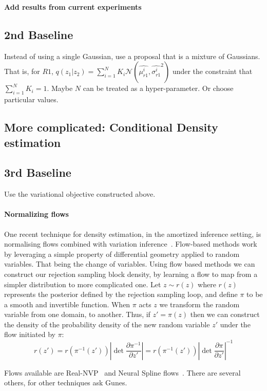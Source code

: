 \documentclass{article}
\begin{document}
\textbf{Add results from current experiments}

\subsection{2nd Baseline}
Instead of using a single Gaussian, use a proposal that is a mixture of Gaussians. 
That is, for $R1$,   $q(z_{1} | z_{2}) = \sum^{N}_{i=1}K_{i}\mathcal{N}(\hat{\mu^{i}_{r1}},  \hat{\sigma^{i}_{r1}}^{2})$
under the constraint that $\sum^{N}_{i=1}K_{i} = 1$. Maybe $N$ can be treated as a hyper-parameter. 
Or choose particular values.
\subsection{More complicated: Conditional Density estimation}

\subsection{3rd Baseline}
 
Use the variational objective constructed above. 

\paragraph{Normalizing flows} One recent technique for density estimation, in the amortized inference setting,
is normalising flows combined with variation inference~\cite{rezende2015variational}.
Flow-based methods work by leveraging a simple property of differential geometry applied 
to random variables. 
That being the change of variables. 
Using flow based methods we can construct our rejection sampling block density, by learning a flow to map from
a simpler distribution to more complicated one.
Let $z \sim r(z)$ where $r(z)$ represents the posterior defined by the rejection
sampling loop, and define $\pi$ to be a smooth and invertible function.
When $\pi$ acts $z$ we transform the random variable from one domain, to another. 
Thus, if $z\prime = \pi(z)$ then we can construct the density of  
the probability density of the new random variable $z\prime$ under the flow initiated by $\pi$: 
\begin{equation}
r(z\prime) = r(\pi^{-1}(z\prime)) \left|\det \frac{\partial \pi^{-1}}{\partial z'}\right| = r(\pi^{-1}(z\prime)) \left|\det \frac{\partial \pi}{\partial z\prime}\right|^{-1} 
\end{equation}

Flows available are Real-NVP~\cite{dinh2016density} and Neural Spline flows~\cite{durkan2019neural}.
There are several others, for other techniques ask Gunes. 
\end{document}
